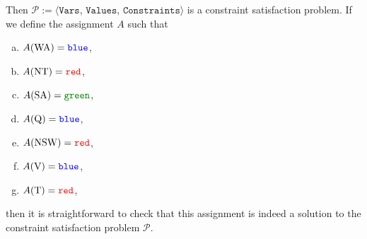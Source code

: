 Then $\mathcal{P} := \langle \texttt{Vars},\, \texttt{Values},\, \texttt{Constraints} \rangle$ is a constraint satisfaction problem.  
If we define the assignment $A$ such that
\begin{enumerate}[(a)]
\item $A(\mathrm{WA}) = \texttt{{\color{blue}blue}}$,
\item $A(\mathrm{NT}) = \texttt{{\color{red}red}}$,
\item $A(\mathrm{SA}) = \texttt{\green{green}}$,
\item $A(\mathrm{Q}) = \texttt{{\color{blue}blue}}$,
\item $A(\mathrm{NSW}) = \texttt{{\color{red}red}}$,
\item $A(\mathrm{V}) = \texttt{{\color{blue}blue}}$,
\item $A(\mathrm{T}) = \texttt{{\color{red}red}}$,
\end{enumerate}
then it is straightforward to check that this assignment is indeed a solution to the constraint satisfaction problem $\mathcal{P}$.

